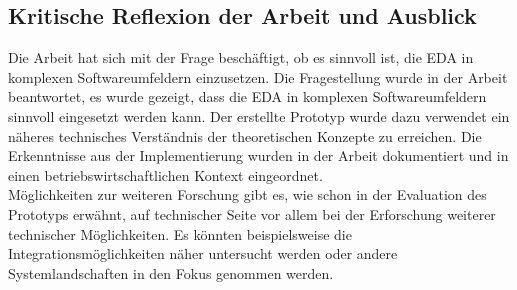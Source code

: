 \subsection{Kritische Reflexion der Arbeit und Ausblick}
Die Arbeit hat sich mit der Frage beschäftigt, ob es sinnvoll ist, die \ac{EDA} in komplexen Softwareumfeldern einzusetzen. Die Fragestellung wurde in der Arbeit beantwortet, es wurde gezeigt, dass die \ac{EDA} in komplexen Softwareumfeldern sinnvoll eingesetzt werden kann. Der erstellte Prototyp wurde dazu verwendet ein näheres technisches Verständnis der theoretischen Konzepte zu erreichen. Die Erkenntnisse aus der Implementierung wurden in der Arbeit dokumentiert und in einen betriebswirtschaftlichen Kontext eingeordnet. \\
Möglichkeiten zur weiteren Forschung gibt es, wie schon in der Evaluation des Prototyps erwähnt, auf technischer Seite vor allem bei der Erforschung weiterer technischer Möglichkeiten. Es könnten beispielsweise die Integrationsmöglichkeiten näher untersucht werden oder andere Systemlandschaften in den Fokus genommen werden. 
